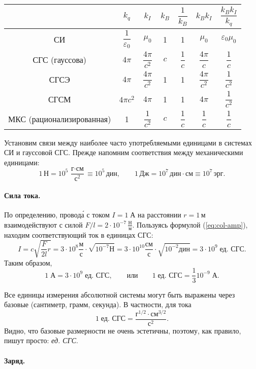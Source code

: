 \begin{table}
\begin{tabular}{|c|c|c|c|c|c|c|}
\hline 
 & $k_{q}$ & $k_{I}$ & $k_{B}$ & $\dfrac{1}{k_{B}}$ & $k_{B}k_{I}$ & $\dfrac{k_{B}k_{I}}{k_{q}}$\tabularnewline
\hline 
\hline 
СИ & $\dfrac{1}{\varepsilon_{0}}$ & $\mu_{0}$ & 1 & 1 & $\mu_{0}$ & $\varepsilon_{0}\mu_{0}$\tabularnewline
\hline 
СГС (гауссова) & $4\pi$ & $\dfrac{4\pi}{c^{2}}$ & $c$ & $\dfrac{1}{c}$ & $\dfrac{4\pi}{c}$ & $\dfrac{1}{c}$\tabularnewline
\hline 
СГСЭ & $4\pi$ & $\dfrac{4\pi}{c^{2}}$ & 1 & 1 & $\dfrac{4\pi}{c^{2}}$ & $\dfrac{1}{c^{2}}$\tabularnewline
\hline 
СГСМ & $4\pi c^{2}$ & $4\pi$ & 1 & 1 & $4\pi$ & $\dfrac{1}{c^{2}}$\tabularnewline
\hline 
МКС (рационализированная) & 1 & $\dfrac{1}{c^{2}}$ & $c$ & $\dfrac{1}{c}$ & $\dfrac{1}{c}$ & $\dfrac{1}{c}$\tabularnewline
\hline 
\end{tabular}

\caption{}
\end{table}
Установим связи между наиболее часто употребляемыми единицами в системах
СИ и гауссовой СГС. Прежде напомним соответствия между механическими
единицами:
\[
1\,\text{Н}=10^{5}\,\frac{\text{г}\cdot\text{см}}{\text{с}^{2}}\equiv10^{5}\,\text{дин},\qquad1\,\text{Дж}=10^{7}\,\text{дин}\cdot\text{см}\equiv10^{7}\,\text{эрг}.
\]


\paragraph{Сила тока.}

По определению, провод\'{а} с током $I=1\;\text{А}$ на расстоянии
$r=1\,\text{м}$ взаимодействуют с силой $F/l=2\cdot10^{-7}\,\frac{\text{Н}}{\text{м}}$.
Пользуясь формулой (\ref{eq:col-amp}), находим соответствующий ток
в единицах СГС:
\[
I=c\sqrt{\frac{F}{2l}r}=3\cdot10^{8}\frac{\text{м}}{\text{с}}\cdot\sqrt{10^{-7}\text{Н}}=3\cdot10^{10}\frac{\text{см}}{\text{с}}\cdot\sqrt{10^{-2}\text{дин}}=3\cdot10^{9}\;\text{ед. СГС}.
\]
Таким образом,
\[
1\;\text{А}=3\cdot10^{9}\;\text{ед. СГС},\qquad\text{или}\qquad1\;\text{ед. СГС}=\frac{1}{3}10^{-9}\;\text{А}.
\]

Все единицы измерения абсолютной системы могут быть выражены через
базовые (сантиметр, грамм, секунда). В частности, для тока
\[
1\;\text{ед. СГС}=\frac{\text{г}^{1/2}\cdot\text{см}^{3/2}}{\text{с}^{2}}.
\]
Видно, что базовые размерности не очень эстетичны, поэтому, как правило,
пишут просто: \emph{ед. СГС}.

\paragraph{Заряд.}

